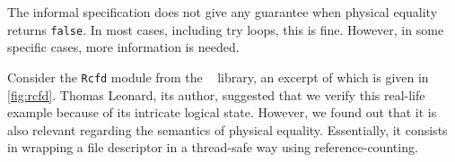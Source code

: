 The informal \OCaml specification does not give any guarantee when physical equality returns \texttt{false}.
In most cases, including try loops, this is fine.
However, in some specific cases, more information is needed.

Consider the \texttt{Rcfd} module from the \Eio~\cite{eio} library, an excerpt of which is given in \cref{fig:rcfd}.
Thomas Leonard, its author, suggested that we verify this real-life example because of its intricate logical state.
However, we found out that it is also relevant regarding the semantics of physical equality.
Essentially, it consists in wrapping a file descriptor in a thread-safe way using reference-counting.

%


